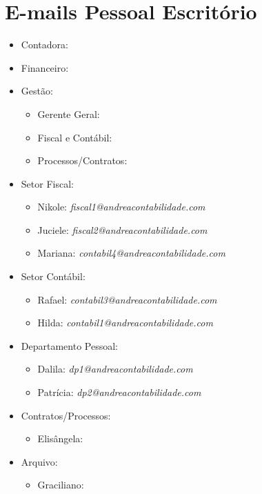 \documentclass{article}
\makeatletter
\newcommand{\at}[1]{\textit{#1@andreacontabilidade.com}}
\newcommand{\emailcontabilum}{\at{contabil1}}
\newcommand{\emailcontabiltres}{\at{contabil3}}
\newcommand{\emailcontabilquatro}{\at{contabil4}}
\newcommand{\emailfiscalum}{\at{fiscal1}}
\newcommand{\emailfiscaldois}{\at{fiscal2}}
\newcommand{\emaildpum}{\at{dp1}}
\newcommand{\emaildpdois}{\at{dp2}}
\makeatother
\begin{document}
\section{E-mails Pessoal Escritório}
\begin{itemize}
  \item Contadora: \emailandrea
  \item Financeiro: \emailabelardo
  \item Gestão:
  \begin{itemize}
    \item Gerente Geral: \emaildanielle
    \item Fiscal e Contábil: \emaildebora
    \item Processos/Contratos: \emailnatalia
  \end{itemize}
  \item Setor Fiscal:
  \begin{itemize}
    \item Nikole: \emailfiscalum
    \item Juciele: \emailfiscaldois
    \item Mariana: \emailcontabilquatro
  \end{itemize}
  \item Setor Contábil:
  \begin{itemize}
    \item Rafael: \emailcontabiltres
    \item Hilda: \emailcontabilum
  \end{itemize}
  \item Departamento Pessoal:
  \begin{itemize}
    \item Dalila: \emaildpum
    \item Patrícia: \emaildpdois
  \end{itemize}
  \item Contratos/Processos:
  \begin{itemize}
    \item Elisângela: \emailprocessos 
  \end{itemize}
  \item Arquivo:
  \begin{itemize}
    \item Graciliano: \emailarquivo
  \end{itemize}
\end{itemize}
\end{document}
